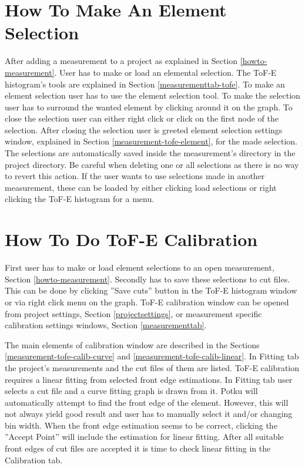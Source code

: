\documentclass{scrreprt}
\begin{document}
\section{How To Make An Element Selection}\label{howto-elemselect}
After adding a measurement to a project as explained in Section \ref{howto-measurement}. User has to make or load an elemental selection.
The ToF-E histogram's tools are explained in Section \ref{measurementtab-tofe}.
To make an element selection user has to use the element selection tool. 
To make the selection user has to surround the wanted element by clicking around it on the graph.
To close the selection user can either right click or click on the first node of the selection.
After closing the selection user is greeted element selection settings window, explained in Section \ref{measurement-tofe-element}, for the made selection. 
The selections are automatically saved inside the measurement's directory in the project directory. 
Be careful when deleting one or all selections as there is no way to revert this action.
If the user wants to use selections made in another measurement, these can be loaded by either clicking load selections or right clicking the ToF-E histogram for a menu.



\section{How To Do ToF-E Calibration}\label{howto-calib}
First user has to make or load element selections to an open measurement, Section \ref{howto-measurement}.
Secondly has to save these selections to cut files. This can be done by clicking ''Save cuts'' button in the ToF-E histogram window or via right click menu on the graph.
ToF-E calibration window can be opened from project settings, Section \ref{projectsettings}, or measurement specific calibration settings windows, Section \ref{measurementtab}.

The main elements of calibration window are described in the Sections \ref{measurement-tofe-calib-curve} and \ref{measurement-tofe-calib-linear}.
In Fitting tab the project's measurements and the cut files of them are listed.
ToF-E calibration requires a linear fitting from selected front edge estimations.
In Fitting tab user selects a cut file and a curve fitting graph is drawn from it.
Potku will automatically attempt to find the front edge of the element.
However, this will not always yield good result and user has to manually select it and/or changing bin width.
When the front edge estimation seems to be correct, clicking the ''Accept Point'' will include the estimation for linear fitting.
After all suitable front edges of cut files are accepted it is time to check linear fitting in the Calibration tab.
\end{document}
